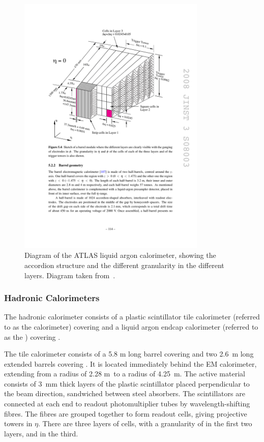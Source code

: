 
\begin{figure}[h]
\centering
\includegraphics[width=0.8\textwidth]{lar-diagram}
\caption[Diagram of the ATLAS liquid argon calorimeter, showing the accordion
structure and the different granularity in the different layers.]{Diagram of the ATLAS liquid argon calorimeter, showing the accordion
structure and the different granularity in the different layers. Diagram taken
from~\cite{1748-0221-3-08-S08003}.}
\label{fig:lar-diagram}
\end{figure}

\subsubsection{Hadronic Calorimeters}

The hadronic calorimeter consists of a plastic scintillator tile calorimeter 
(referred to as the  calorimeter) covering  and a liquid
argon endcap calorimeter (referred to as the ) covering
. 

The tile calorimeter consists of a 5.8 m long barrel covering
 and two 2.6~m long extended barrels covering
.
It is located immediately behind the EM calorimeter, extending from a radius of
2.28 m~to a radius of 4.25~m. The active material consists of 3~mm thick layers of the plastic scintillator 
placed perpendicular to the beam direction, sandwiched between steel absorbers.
The scintillators are connected at each end to
readout photomultiplier tubes by wavelength-shifting fibres. The fibres are grouped
together to form readout cells, giving projective towers in $\eta$. There are
three layers of cells, with a granularity of  in the
first two layers, and  in the third.


